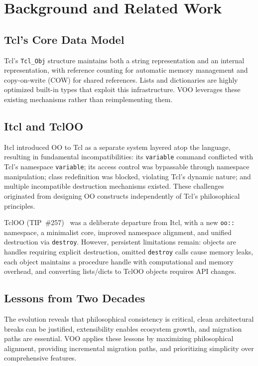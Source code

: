 \section{Background and Related Work}

\subsection{Tcl's Core Data Model}

Tcl's \texttt{Tcl\_Obj} structure maintains both a string representation and an internal
representation, with reference counting for automatic memory management and copy-on-write
(COW) for shared references. Lists and dictionaries are highly optimized built-in types
that exploit this infrastructure. VOO leverages these existing mechanisms rather than
reimplementing them.

\subsection{Itcl and TclOO}

Itcl introduced OO to Tcl as a separate system layered atop the language, resulting in
fundamental incompatibilities: its \texttt{variable} command conflicted with Tcl's
namespace \texttt{variable}; its access control was bypassable through namespace
manipulation; class redefinition was blocked, violating Tcl's dynamic nature; and
multiple incompatible destruction mechanisms existed. These challenges originated from
designing OO constructs independently of Tcl's philosophical principles.

TclOO (TIP~\#257)~\cite{fellows2006} was a deliberate departure from Itcl, with a new
\texttt{oo::} namespace, a minimalist core, improved namespace alignment, and unified
destruction via \texttt{destroy}. However, persistent limitations remain: objects are
handles requiring explicit destruction, omitted \texttt{destroy} calls cause memory
leaks, each object maintains a procedure handle with computational and memory overhead,
and converting lists/dicts to TclOO objects requires API changes.

\subsection{Lessons from Two Decades}

The evolution reveals that philosophical consistency is critical, clean architectural
breaks can be justified, extensibility enables ecosystem growth, and migration paths
are essential. VOO applies these lessons by maximizing philosophical alignment,
providing incremental migration paths, and prioritizing simplicity over comprehensive
features.
